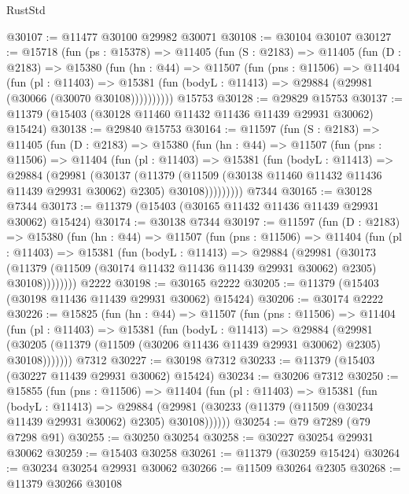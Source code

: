 \begin{lexlean}{RustStd}
\begin{coremodule}
@30107 := @11477 @30100 @29982 @30071
@30108 := @30104 @30107
@30127 := @15718
    (fun (ps : @15378) =>
    @11405
      (fun (S : @2183) =>
      @11405
        (fun (D : @2183) =>
        @15380
          (fun (hn : @44) =>
          @11507
            (fun (pns : @11506) =>
            @11404
              (fun (pl : @11403) =>
              @15381 (fun (bodyL : @11413) => @29884 (@29981 (@30066 (@30070 @30108))))))))))
    @15753
@30128 := @29829 @15753
@30137 := @11379 (@15403 (@30128 @11460 @11432 @11436 @11439 @29931 @30062) @15424)
@30138 := @29840 @15753
@30164 := @11597
    (fun (S : @2183) =>
    @11405
      (fun (D : @2183) =>
      @15380
        (fun (hn : @44) =>
        @11507
          (fun (pns : @11506) =>
          @11404
            (fun (pl : @11403) =>
            @15381
              (fun (bodyL : @11413) =>
              @29884
                (@29981
                  (@30137
                    (@11379
                      (@11509 (@30138 @11460 @11432 @11436 @11439 @29931 @30062) @2305)
                      @30108)))))))))
    @7344
@30165 := @30128 @7344
@30173 := @11379 (@15403 (@30165 @11432 @11436 @11439 @29931 @30062) @15424)
@30174 := @30138 @7344
@30197 := @11597
    (fun (D : @2183) =>
    @15380
      (fun (hn : @44) =>
      @11507
        (fun (pns : @11506) =>
        @11404
          (fun (pl : @11403) =>
          @15381
            (fun (bodyL : @11413) =>
            @29884
              (@29981
                (@30173
                  (@11379 (@11509 (@30174 @11432 @11436 @11439 @29931 @30062) @2305) @30108))))))))
    @2222
@30198 := @30165 @2222
@30205 := @11379 (@15403 (@30198 @11436 @11439 @29931 @30062) @15424)
@30206 := @30174 @2222
@30226 := @15825
    (fun (hn : @44) =>
    @11507
      (fun (pns : @11506) =>
      @11404
        (fun (pl : @11403) =>
        @15381
          (fun (bodyL : @11413) =>
          @29884
            (@29981
              (@30205 (@11379 (@11509 (@30206 @11436 @11439 @29931 @30062) @2305) @30108)))))))
    @7312
@30227 := @30198 @7312
@30233 := @11379 (@15403 (@30227 @11439 @29931 @30062) @15424)
@30234 := @30206 @7312
@30250 := @15855
    (fun (pns : @11506) =>
    @11404
      (fun (pl : @11403) =>
      @15381
        (fun (bodyL : @11413) =>
        @29884 (@29981 (@30233 (@11379 (@11509 (@30234 @11439 @29931 @30062) @2305) @30108))))))
@30254 := @79 @7289 (@79 @7298 @91)
@30255 := @30250 @30254
@30258 := @30227 @30254 @29931 @30062
@30259 := @15403 @30258
@30261 := @11379 (@30259 @15424)
@30264 := @30234 @30254 @29931 @30062
@30266 := @11509 @30264 @2305
@30268 := @11379 @30266 @30108

\end{coremodule}
\end{lexlean}
